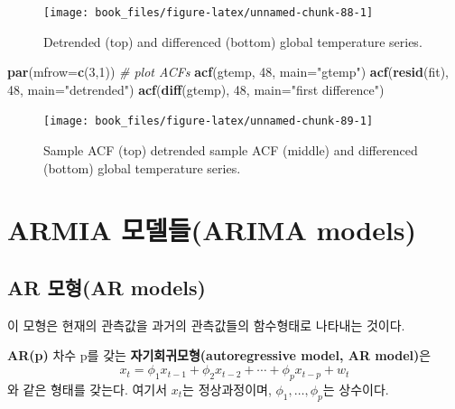 \documentclass[b5paper,]{scrbook}
\makeatletter
\newenvironment{Shaded}{\begin{snugshade}}{\end{snugshade}}
\newcommand{\KeywordTok}[1]{\textcolor[rgb]{0.13,0.29,0.53}{\textbf{{#1}}}}
\newcommand{\DataTypeTok}[1]{\textcolor[rgb]{0.13,0.29,0.53}{{#1}}}
\newcommand{\DecValTok}[1]{\textcolor[rgb]{0.00,0.00,0.81}{{#1}}}
\newcommand{\StringTok}[1]{\textcolor[rgb]{0.31,0.60,0.02}{{#1}}}
\newcommand{\CommentTok}[1]{\textcolor[rgb]{0.56,0.35,0.01}{\textit{{#1}}}}
\newcommand{\NormalTok}[1]{{#1}}
\theoremstyle{plain}
\theoremstyle{definition}
\numberwithin{equation}{section}
\newenvironment{kframe}{%
\medskip{}
\setlength{\fboxsep}{.8em}
 \def\at@end@of@kframe{}%
 \ifinner\ifhmode%
  \def\at@end@of@kframe{\end{minipage}}%
  \begin{minipage}{\columnwidth}%
 \fi\fi%
 \def\FrameCommand##1{\hskip\@totalleftmargin \hskip-\fboxsep
 \colorbox{shadecolor}{##1}\hskip-\fboxsep
     \hskip-\linewidth \hskip-\@totalleftmargin \hskip\columnwidth}%
 \MakeFramed {\advance\hsize-\width
   \@totalleftmargin\z@ \linewidth\hsize
   \@setminipage}}%
 {\par\unskip\endMakeFramed%
 \at@end@of@kframe}
\renewenvironment{Shaded}{\begin{kframe}}{\end{kframe}}
\let\BeginKnitrBlock\begin \let\EndKnitrBlock\end
\makeatother
\begin{document}
\begin{figure}

{\centering \texttt{[image: book\_files/figure-latex/unnamed-chunk-88-1]} 

}

\caption{Detrended (top) and differenced (bottom) global temperature series.}\label{fig:unnamed-chunk-88}
\end{figure}

\begin{Shaded}
\begin{Highlighting}[]
\KeywordTok{par}\NormalTok{(}\DataTypeTok{mfrow=}\KeywordTok{c}\NormalTok{(}\DecValTok{3}\NormalTok{,}\DecValTok{1}\NormalTok{)) }\CommentTok{# plot ACFs}
\KeywordTok{acf}\NormalTok{(gtemp, }\DecValTok{48}\NormalTok{, }\DataTypeTok{main=}\StringTok{"gtemp"}\NormalTok{)}
\KeywordTok{acf}\NormalTok{(}\KeywordTok{resid}\NormalTok{(fit), }\DecValTok{48}\NormalTok{, }\DataTypeTok{main=}\StringTok{"detrended"}\NormalTok{)}
\KeywordTok{acf}\NormalTok{(}\KeywordTok{diff}\NormalTok{(gtemp), }\DecValTok{48}\NormalTok{, }\DataTypeTok{main=}\StringTok{"first difference"}\NormalTok{)}
\end{Highlighting}
\end{Shaded}

\begin{figure}

{\centering \texttt{[image: book\_files/figure-latex/unnamed-chunk-89-1]} 

}

\caption{Sample ACF (top) detrended sample ACF (middle) and differenced (bottom) global temperature series.}\label{fig:unnamed-chunk-89}
\end{figure}

\section{ARMIA 모델들(ARIMA models)}\label{armia-arima-models}

\subsection{AR 모형(AR models)}\label{ar-ar-models}

이 모형은 현재의 관측값을 과거의 관측값들의 함수형태로 나타내는 것이다.

\BeginKnitrBlock{definition}[자기회귀모형]
\protect\hypertarget{def:unnamed-chunk-90}{}{\label{def:unnamed-chunk-90}
{} }\textbf{AR(p)} 차수 p를 갖는
\textbf{자기회귀모형(autoregressive model, AR model)}은
\[x_{t}=\phi_{1}x_{t-1}+\phi_{2}x_{t-2} + \cdots + \phi_{p}x_{t-p}+w_{t}\]
와 같은 형태를 갖는다. 여기서 \(x_{t}\)는 정상과정이며,
\(\phi_{1},\ldots , \phi_{p}\)는 상수이다.
\EndKnitrBlock{definition}
\end{document}
